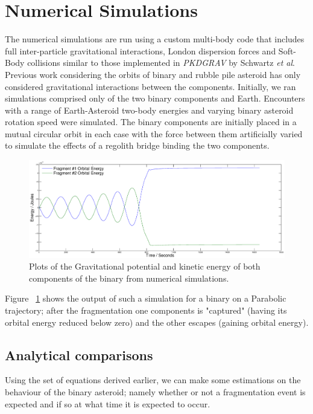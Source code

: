 \documentclass[letterpaper, preprint, paper,11pt]{AAS}	%
\begin{document}
 




\section{Numerical Simulations}
The numerical simulations are run using a custom multi-body code that includes full inter-particle gravitational interactions, London dispersion forces and Soft-Body collisions similar to those implemented in \textit{PKDGRAV} by Schwartz \textit{et al}\cite{soft}.
Previous work considering the orbits of binary and rubble pile asteroid has only considered gravitational interactions between the components. 
Initially, we ran simulations comprised only of the two binary components and Earth. Encounters with a range of Earth-Asteroid two-body energies and varying binary asteroid rotation speed were simulated. The binary components are initially placed in a mutual circular orbit in each case with the force between them artificially varied to simulate the effects of a regolith bridge binding the two components.
\begin{figure}[H]
\centering
\includegraphics[width=\textwidth]{binary_num.eps} 
\caption{Plots of the Gravitational potential and kinetic energy of both components of the binary from numerical simulations.} 
\label{fig:Num}
\end{figure}
 Figure ~\ref{fig:Num} shows the output of such a simulation for a binary on a Parabolic trajectory; after the fragmentation one components is "captured" (having its orbital energy reduced below zero) and the other escapes (gaining orbital energy).  
 
\subsection{Analytical comparisons}

Using the set of equations derived earlier, we can make some estimations on the behaviour of the binary asteroid; namely whether or not a fragmentation event is expected and if so at what time it is expected to occur.
\end{document}
